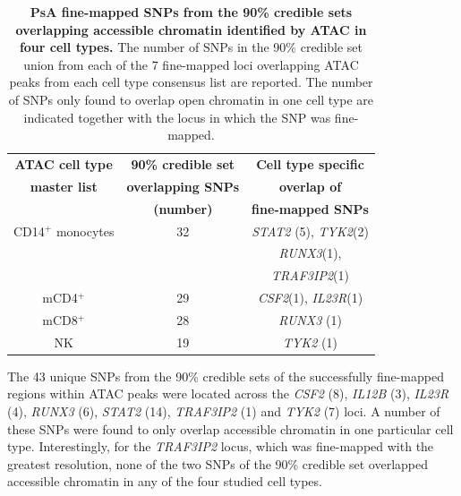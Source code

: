 \begin{table}[htbp]
\centering
\begin{tabular}{@{} c c c}
\toprule
\textbf{ATAC cell type} & \textbf{90\% credible set}   &  \textbf{Cell type specific}  \\
\textbf{master list}    & \textbf{overlapping SNPs}    &   \textbf{overlap of}   \\
									      &	\textbf{(number)}				     &   \textbf{fine-mapped SNPs} \\
\midrule
\midrule
 CD14$^+$ monocytes    & 32                            &  \textit{STAT2} (5), \textit{TYK2}(2)\\ 
                       &                               &  \textit{RUNX3}(1),\\
											 &                               &  \textit{TRAF3IP2}(1) \\
 mCD4$^+$              & 29                            &  \textit{CSF2}(1), \textit{IL23R}(1) \\
 mCD8$^+$              & 28                            &  \textit{RUNX3} (1)        \\
 NK                    & 19                            &  \textit{TYK2} (1)       \\
\bottomrule
\end{tabular}
\medskip %
\caption[PsA fine-mapped SNPs from the 90\% credible sets overlapping accessible chromatin identified by ATAC in four cell types.]{\textbf{PsA fine-mapped SNPs from the 90\% credible sets overlapping accessible chromatin identified by ATAC in four cell types.} The number of SNPs in the 90\% credible set union from each of the 7 fine-mapped loci overlapping ATAC peaks from each cell type consensus list are reported. The number of SNPs only found to overlap open chromatin in one cell type are indicated together with the locus in which the SNP was fine-mapped.}
\label{tab:PSA_fine_mapping_ATAC_overlap}
\end{table}


The 43 unique SNPs from the 90\% credible sets of the successfully fine-mapped regions within ATAC peaks were located across the \textit{CSF2} (8), \textit{IL12B} (3), \textit{IL23R} (4), \textit{RUNX3} (6), \textit{STAT2} (14), \textit{TRAF3IP2} (1) and \textit{TYK2} (7) loci. A number of these SNPs were found to only overlap accessible chromatin in one particular cell type. Interestingly, for the \textit{TRAF3IP2} locus, which was fine-mapped with the greatest resolution, none of the two SNPs of the 90\% credible set overlapped accessible chromatin in any of the four studied cell types.


